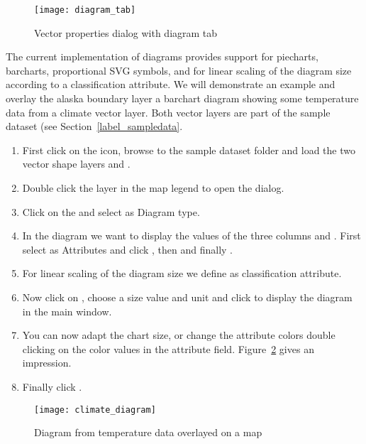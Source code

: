 \begin{figure}[ht]
   \centering
   \texttt{[image: diagram\_tab]}
   \caption{Vector properties dialog with diagram tab \nixcaption}\label{fig:diagramtab}
\end{figure}

The current implementation of diagrams provides support for piecharts, barcharts,
proportional SVG symbols, and for linear scaling of the diagram size according
to a classification attribute. We will demonstrate an example and overlay the
alaska boundary layer a barchart diagram showing some temperature data from
a climate vector layer. Both vector layers are part of the \qg sample dataset (see
Section~\ref{label_sampledata}.

\begin{enumerate}
\item First click on the  icon,
browse to the \qg sample dataset folder and load the two vector shape layers
 and .
\item Double click the  layer in the map legend to open the
 dialog.
\item Click on the  and select  as
Diagram type.
\item In the diagram we want to display the values of the three columns
 and . First select
 as Attributes and click , then
 and finally .
\item For linear scaling of the diagram size we define 
as classification attribute.
\item Now click on , choose a size value and unit
and click  to display the diagram in the \qg main window.
\item You can now adapt the chart size, or change the attribute colors double
clicking on the color values in the attribute field.
Figure~\ref{fig:climatediagram} gives an impression.
\item Finally click .
\end{enumerate}

\begin{figure}[ht]
   \centering
   \texttt{[image: climate\_diagram]}
   \caption{Diagram from temperature data overlayed on a map \nixcaption}\label{fig:climatediagram}
\end{figure}

